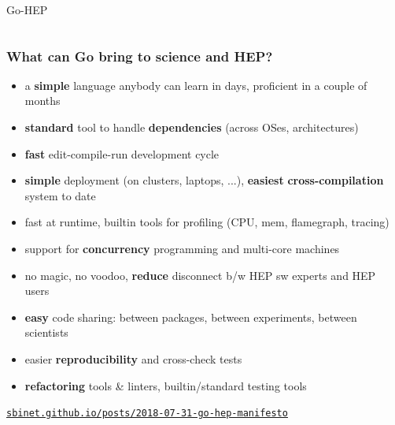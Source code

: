 \documentclass[9pt]{beamer}
\newcommand{\myblue} [1] {{\color{blue}#1}}
\begin{document}
\begin{frame}[fragile]
	\begin{columns}
		\begin{column}{0.49\textwidth}
			\begin{block}{}
				\begin{center}
Go-HEP
				\end{center}
			\end{block}
		\end{column}
	\end{columns}



\end{frame}

\begin{frame}[fragile]
\frametitle{What can Go bring to science and HEP?}


\begin{itemize}
\item a \textbf{simple} language anybody can learn in days, proficient in a couple of months
\item \textbf{standard} tool to handle \textbf{dependencies} (across OSes, architectures)
\item \textbf{fast} edit-compile-run development cycle
\item \textbf{simple} deployment (on clusters, laptops, ...), \textbf{easiest} \textbf{cross-compilation} system to date
\item fast at runtime, builtin tools for profiling (CPU, mem, flamegraph, tracing)
\item support for \textbf{concurrency} programming and multi-core machines
\item no magic, no voodoo, \textbf{reduce} disconnect b/w HEP sw experts and HEP users
\item \textbf{easy} code sharing: between packages, between experiments, between scientists
\item easier \textbf{reproducibility} and cross-check tests
\item \textbf{refactoring} tools \& linters, builtin/standard testing tools
\end{itemize}

	\begin{block}{}
		\begin{center}
\myblue{\href{https://sbinet.github.io/posts/2018-07-31-go-hep-manifesto}{\texttt{sbinet.github.io/posts/2018-07-31-go-hep-manifesto}}}
		\end{center}
	\end{block}{}


\end{frame}
\end{document}
